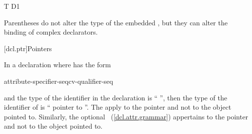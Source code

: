 \begin{codeblock}
T D1
\end{codeblock}

%
Parentheses do not alter the type of the embedded
,
but they can alter the binding of complex declarators.

[dcl.ptr]{Pointers}%
%

\pnum
In a declaration
where
has the form

\begin{ncsimplebnf}
\terminal{*} attribute-specifier-seq\opt cv-qualifier-seq\opt{} 
\end{ncsimplebnf}

and the type of the identifier in the declaration
is ``
'',
then the type of the identifier of
is `` pointer to
''.
%
%
The
apply to the pointer and not to the object pointed to.
Similarly, the optional ~(\ref{dcl.attr.grammar}) appertains to the pointer and not to the object pointed to.

